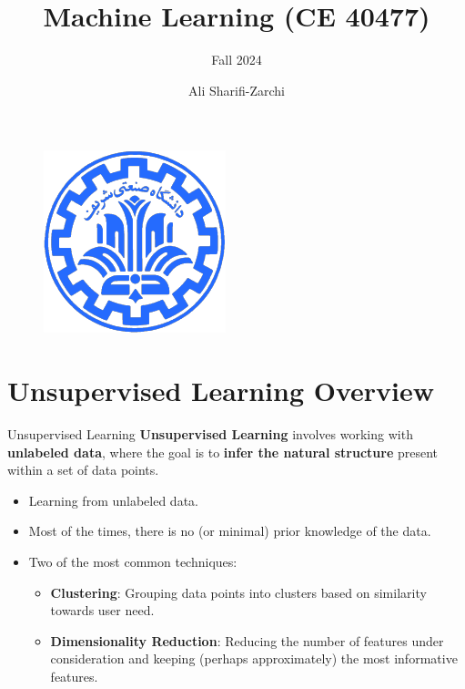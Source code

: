 \documentclass[serif, aspectratio=169]{beamer}
\author{Ali Sharifi-Zarchi}
\title{Machine Learning (CE 40477)}
\subtitle{Fall 2024}
\institute{
    CE Department \\
    Sharif University of Technology
}
\begin{document}
\begin{frame}
    \titlepage
    \vspace*{-0.6cm}
    \begin{figure}[htpb]
        \begin{center}
            \includegraphics[keepaspectratio, scale=0.25]{pic/sharif-main-logo.png}
        \end{center}
    \end{figure}
\end{frame}

\begin{frame}    
\tableofcontents[sectionstyle=show,
subsectionstyle=show/shaded/hide,
subsubsectionstyle=show/shaded/hide]
\end{frame}

\section{Unsupervised Learning Overview}
\begin{frame}{Unsupervised Learning}
    \textbf{Unsupervised Learning} involves working with \textbf{unlabeled data}, where the goal is to \textbf{infer the natural structure} present within a set of data points.
    \begin{itemize}
        \item Learning from unlabeled data.
        \item Most of the times, there is no (or minimal) prior knowledge of the data.
        \item Two of the most common techniques:
        \begin{itemize}
            \item \textbf{Clustering}: Grouping data points into clusters based on similarity towards user need.
            \item \textbf{Dimensionality Reduction}: Reducing the number of features under consideration and keeping (perhaps approximately) the most informative features.
        \end{itemize}
    \end{itemize}
\end{frame}
\end{document}
